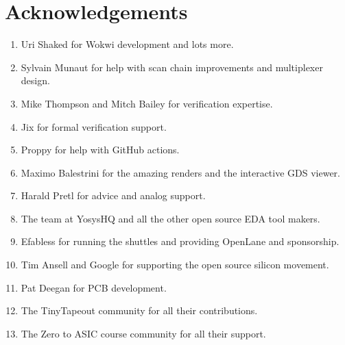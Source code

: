 \section{Acknowledgements}
\label{sec:acknowledgements}

\begin{enumerate}
    \item Uri Shaked for Wokwi development and lots more.
    \item Sylvain Munaut for help with scan chain improvements and multiplexer design.
    \item Mike Thompson and Mitch Bailey for verification expertise.
    \item Jix for formal verification support.
    \item Proppy for help with GitHub actions.
    \item Maximo Balestrini for the amazing renders and the interactive GDS viewer.
    \item Harald Pretl for advice and analog support.
    \item The team at YosysHQ and all the other open source EDA tool makers.
    \item Efabless for running the shuttles and providing OpenLane and sponsorship.
    \item Tim Ansell and Google for supporting the open source silicon movement.
    \item Pat Deegan for PCB development.
    \item The TinyTapeout community for all their contributions.
    \item The Zero to ASIC course community for all their support.
\end{enumerate}
